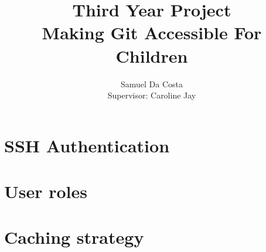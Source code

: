 \documentclass[a4paper]{report}
\begin{document}
\newcommand{\commit}[0]{\texttt{commit}}
\newcommand{\fig}[4]{

\begin{figure} 
    \centering
    \texttt{[image: \#1]}
    \caption{#2}
    \label{#3}
\end{figure}


}

\title{Third Year Project \\
\large Making Git Accessible For Children \\
}
\author{Samuel Da Costa\\
Supervisor: Caroline Jay}
\maketitle





\begin{appendices}

\chapter{SSH Authentication}\label{appendix_sshkeys}

\chapter{User roles}\label{appendix_users}

\chapter{Caching strategy}\label{appendix_caching}

\end{appendices}



\end{document}
